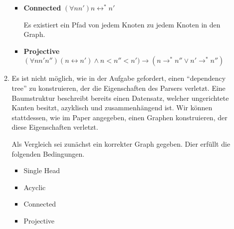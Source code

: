 \documentclass[a4paper]{scrartcl}
\begin{document}
\begin{enumerate}
\begin{enumerate}[label=(\alph*)]
{\begin{itemize}
            \item {\textbf{Connected}    $(\forall n n') n \leftrightarrow^\ast n'$
            
            Es existiert ein Pfad von jedem Knoten zu jedem Knoten in den Graph.
	        }
            
            \item  {\textbf{Projective} $(\forall n n' n'') (n \leftrightarrow n') \land n < n'' < n') \rightarrow (n \rightarrow^\ast n'' \lor n' \rightarrow^\ast n'')$
	        
	        }
		    \end{itemize}
	        }
            
            \item
            Es ist nicht möglich, wie in der Aufgabe gefordert, einen "`dependency tree"' zu konstruieren, der die Eigenschaften des Parsers verletzt. Eine Baumstruktur beschreibt bereits einen Datensatz, welcher ungerichtete Kanten besitzt, azyklisch und zusammenhängend ist. Wir können stattdessen, wie im Paper angegeben, einen Graphen konstruieren, der diese Eigenschaften verletzt.
            
            Als Vergleich sei zunächst ein korrekter Graph gegeben. Dier erfüllt die folgenden Bedingungen.
            
            \begin{itemize}
            	\item Single Head
            	\item Acyclic
            	\item Connected
            	\item Projective
            \end{itemize}
            
\begin{figure}[H]
	\centering

	

\end{figure}
\end{enumerate}
\end{enumerate}
\end{document}
